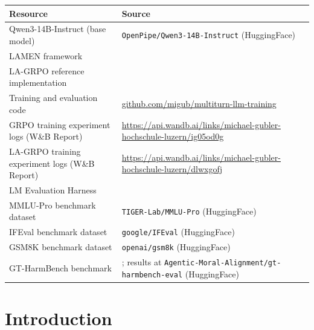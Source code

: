 \documentclass[12pt,a4paper]{article}
\renewcommand{\arraystretch}{1.25}
\begin{document}
\renewcommand{\arraystretch}{1.5}
\begin{tabularx}{\textwidth}{@{}>{\raggedright\arraybackslash}p{6.5cm}>{\raggedright\arraybackslash}X@{}}
\textbf{Resource} & \textbf{Source} \\
\hline
Qwen3-14B-Instruct (base model) & \texttt{OpenPipe/Qwen3-14B-Instruct} (HuggingFace) \\
LAMEN framework & \citet{davidson2024evaluatinglanguagemodelagency} \\
LA-GRPO reference implementation & \citet{franceschetti2025advantage} \\
Training and evaluation code & \url{github.com/migub/multiturn-llm-training} \\
GRPO training experiment logs (W\&B Report) & \url{https://api.wandb.ai/links/michael-gubler-hochschule-luzern/ig05od0g} \\
LA-GRPO training experiment logs (W\&B Report) & \url{https://api.wandb.ai/links/michael-gubler-hochschule-luzern/dlwxgofj} \\
LM Evaluation Harness & \citet{eval-harness} \\
MMLU-Pro benchmark dataset & \texttt{TIGER-Lab/MMLU-Pro} (HuggingFace) \\
IFEval benchmark dataset & \texttt{google/IFEval} (HuggingFace) \\
GSM8K benchmark dataset & \texttt{openai/gsm8k} (HuggingFace) \\
GT-HarmBench benchmark & \citet{cobben2026gtharmbench}; results at \texttt{Agentic-Moral-Alignment/gt-harmbench-eval} (HuggingFace) \\
\end{tabularx}
\renewcommand{\arraystretch}{1.0}

\newpage


\section{Introduction}
\label{sec:introduction}
\end{document}
